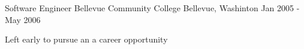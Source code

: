 

\begin{cventries}

  \cventry
      {Software Engineer} %
      {Bellevue Community College} %
      {Bellevue, Washinton} %
      {Jan 2005 - May 2006} %
      {
        \begin{cvitems} %
        \item {Left early to pursue an a career opportunity}
        \end{cvitems}
      }

      \end{cventries}
